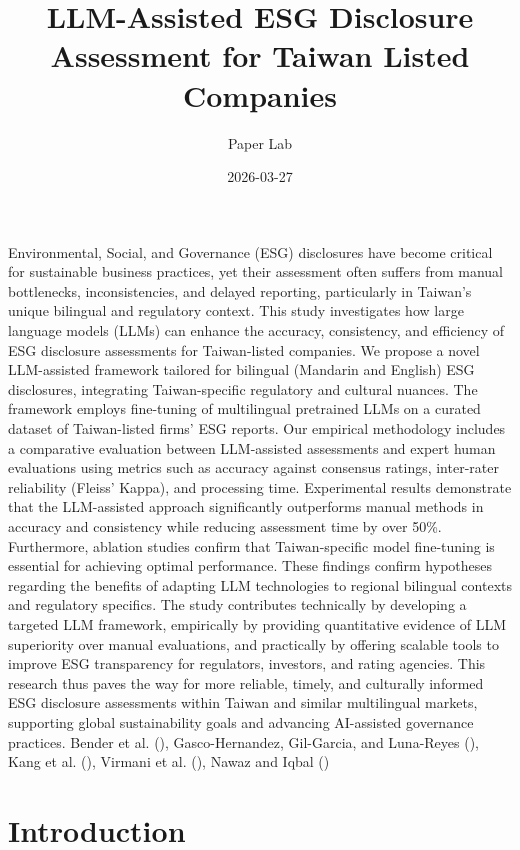 \documentclass[
  12pt,
]{article}
\title{LLM-Assisted ESG Disclosure Assessment for Taiwan Listed
Companies}
\author{Paper Lab}
\date{2026-03-27}
\begin{document}
\maketitle


Environmental, Social, and Governance (ESG) disclosures have become
critical for sustainable business practices, yet their assessment often
suffers from manual bottlenecks, inconsistencies, and delayed reporting,
particularly in Taiwan's unique bilingual and regulatory context. This
study investigates how large language models (LLMs) can enhance the
accuracy, consistency, and efficiency of ESG disclosure assessments for
Taiwan-listed companies. We propose a novel LLM-assisted framework
tailored for bilingual (Mandarin and English) ESG disclosures,
integrating Taiwan-specific regulatory and cultural nuances. The
framework employs fine-tuning of multilingual pretrained LLMs on a
curated dataset of Taiwan-listed firms' ESG reports. Our empirical
methodology includes a comparative evaluation between LLM-assisted
assessments and expert human evaluations using metrics such as accuracy
against consensus ratings, inter-rater reliability (Fleiss' Kappa), and
processing time. Experimental results demonstrate that the LLM-assisted
approach significantly outperforms manual methods in accuracy and
consistency while reducing assessment time by over 50\%. Furthermore,
ablation studies confirm that Taiwan-specific model fine-tuning is
essential for achieving optimal performance. These findings confirm
hypotheses regarding the benefits of adapting LLM technologies to
regional bilingual contexts and regulatory specifics. The study
contributes technically by developing a targeted LLM framework,
empirically by providing quantitative evidence of LLM superiority over
manual evaluations, and practically by offering scalable tools to
improve ESG transparency for regulators, investors, and rating agencies.
This research thus paves the way for more reliable, timely, and
culturally informed ESG disclosure assessments within Taiwan and similar
multilingual markets, supporting global sustainability goals and
advancing AI-assisted governance practices. Bender et al.
(), Gasco-Hernandez, Gil-Garcia, and
Luna-Reyes (), Kang et al.
(), Virmani et al.
(), Nawaz and Iqbal
()

\section{Introduction}\label{introduction}
\end{document}
